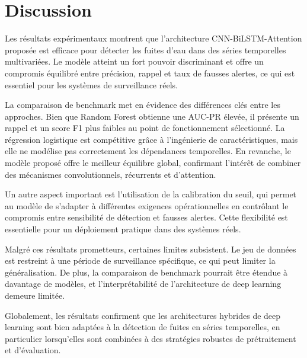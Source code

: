 \section{Discussion}

\noindent Les résultats expérimentaux montrent que l'architecture
CNN-BiLSTM-Attention proposée est efficace pour détecter les fuites d'eau dans
des séries temporelles multivariées. Le modèle atteint un fort pouvoir
discriminant et offre un compromis équilibré entre précision, rappel et taux de
fausses alertes, ce qui est essentiel pour les systèmes de surveillance réels.

\vspace{0.2cm}

\noindent La comparaison de benchmark met en évidence des différences clés entre les
approches. Bien que Random Forest obtienne une AUC-PR élevée, il présente un
rappel et un score F1 plus faibles au point de fonctionnement sélectionné. La
régression logistique est compétitive grâce à l'ingénierie de caractéristiques,
mais elle ne modélise pas correctement les dépendances temporelles. En revanche,
le modèle proposé offre le meilleur équilibre global, confirmant l'intérêt de
combiner des mécanismes convolutionnels, récurrents et d'attention.

\vspace{0.2cm}

\noindent Un autre aspect important est l'utilisation de la calibration du seuil,
qui permet au modèle de s'adapter à différentes exigences opérationnelles en
contrôlant le compromis entre sensibilité de détection et fausses alertes.
Cette flexibilité est essentielle pour un déploiement pratique dans des systèmes
réels.

\vspace{0.2cm}

\noindent Malgré ces résultats prometteurs, certaines limites subsistent. Le jeu de
données est restreint à une période de surveillance spécifique, ce qui peut
limiter la généralisation. De plus, la comparaison de benchmark pourrait être
étendue à davantage de modèles, et l'interprétabilité de l'architecture de deep
learning demeure limitée.

\vspace{0.2cm}

\noindent Globalement, les résultats confirment que les architectures hybrides de
deep learning sont bien adaptées à la détection de fuites en séries temporelles,
en particulier lorsqu'elles sont combinées à des stratégies robustes de
prétraitement et d'évaluation.